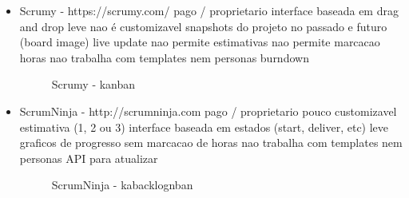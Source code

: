 \begin{itemize}
\item Scrumy - https://scrumy.com/
pago / proprietario
interface baseada em drag and drop
leve
nao é customizavel
snapshots do projeto no passado e futuro (board image)
live update
nao permite estimativas
nao permite marcacao horas
nao trabalha com templates nem personas
burndown

\begin{figure}[htbp]
  \centering
  \caption{Scrumy - kanban}
\end{figure}

\item ScrumNinja - http://scrumninja.com
pago / proprietario
pouco customizavel
estimativa (1, 2 ou 3)
interface baseada em estados (start, deliver, etc)
leve
graficos de progresso
sem marcacao de horas
nao trabalha com templates nem personas
API para atualizar

\begin{figure}[htbp]
  \centering
  \caption{ScrumNinja - kabacklognban}
\end{figure}


\end{itemize}
